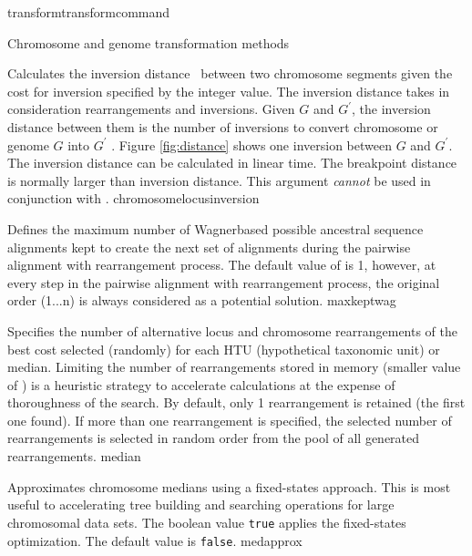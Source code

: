 \begin{command}{transform}{transformcommand}
\begin{arguments}
\begin{argumentgroup}{Chromosome and genome transformation methods}
\begin{description}
{Calculates the inversion distance~\cite{hanenhalliandpevzner1995}
between two chromosome segments given the cost for inversion
specified by the integer value. The inversion distance
takes in consideration rearrangements and
inversions. Given $G$ and $G^\prime$, the inversion distance between
them is the number of inversions to convert chromosome or genome $G$ 
into $G^\prime$ \cite{hanenhalliandpevzner1995}. Figure \ref{fig:distance} 
shows one inversion between $G$ and $G^\prime$. The inversion 
distance can be calculated in linear time. The breakpoint distance is 
normally larger than inversion distance. %
This argument \emph{cannot} be used in conjunction with
.} %
{chromosomelocusinversion} 

{Defines the maximum number of Wagner\-based possible ancestral sequence
alignments kept to create the next set of alignments during the pairwise alignment
with rearrangement process. The default value of  is 1,
however, at every step in the pairwise alignment with rearrangement process, the original
order (1...n) is always considered as a potential solution.}
{maxkeptwag}

{Specifies the number of alternative locus and chromosome
rearrangements of the best cost selected (randomly) for
each HTU (hypothetical taxonomic unit) or median. Limiting the number of rearrangements
stored in memory (smaller value of )
is a heuristic strategy to accelerate calculations at the
expense of thoroughness of the search. By default, only 1
rearrangement is retained (the first one found). If more than
one rearrangement is specified, the selected number of
rearrangements is selected in random order from the pool of
all generated rearrangements.}
{median}

{Approximates chromosome medians using a fixed-states
approach. This is most useful to accelerating tree
building and searching operations for large chromosomal
data sets. The boolean value \texttt{true} applies the
fixed-states optimization. The default value is
\texttt{false}.}
{medapprox}


\end{description}
\end{argumentgroup}
\end{arguments}
\end{command}
